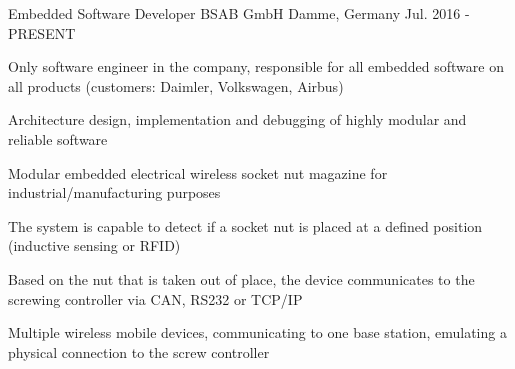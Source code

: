\begin{cventries}
  \cventry
    {Embedded Software Developer} %
    {BSAB GmbH} %
    {Damme, Germany} %
    {Jul. 2016 - PRESENT} %
    {
      \begin{cvitems} %
        \item {Only software engineer in the company, responsible for all embedded software on all products (customers: Daimler, Volkswagen, Airbus)}
        \item {Architecture design, implementation and debugging of highly modular and reliable software}
        \item {Modular embedded electrical wireless socket nut magazine for industrial/manufacturing purposes}
        \item {The system is capable to detect if a socket nut is placed at a defined position (inductive sensing or RFID)}
        \item {Based on the nut that is taken out of place, the device communicates to the screwing controller via CAN, RS232 or TCP/IP}
        \item {Multiple wireless mobile devices, communicating to one base station, emulating a physical connection to the screw controller}
      \end{cvitems}
    }

\begin{comment}
  \cventry
    {Internship} %
    {DFKI (German Researchcenter for AI) GmbH} %
    {Bremen, Germany} %
    {Oct. 2015 - Dez. 2015} %
    {
      \begin{cvitems} %
        \item {Familiarized with the Xilinx FPGA toolchain and VHDL by implementing PWM, FIFO, UART and I2C}
        \item {Fixed a bug in the VHDL driver of a camera module which prevented using the camera with the highest resolution}
        \item {Implementated a Canny Edge filter and a Circle-Hough-Transformation on a FPGA development kit with camera in VHDL, Qt C++ GUI}
        \item {Bridged the VHDL modules to an emulated Microblaze Softcore on the FPGA}
      \end{cvitems}
    }
\end{comment}
\end{cventries}
